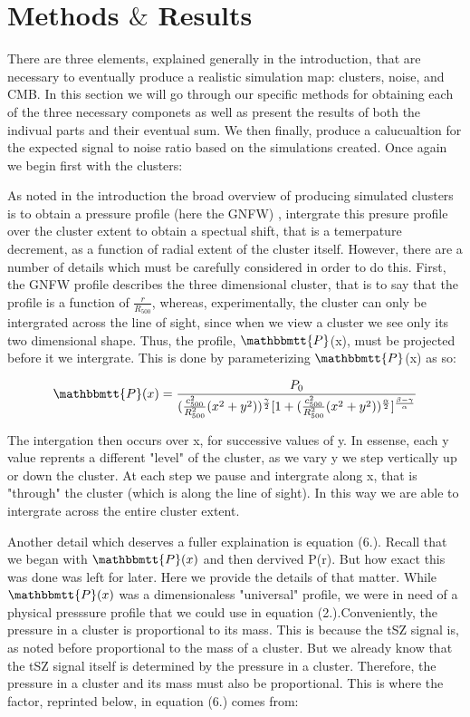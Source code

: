 \documentclass[12pt]{article} %
\begin{document}
\section{Methods $\&$ Results}

There are three elements, explained generally in the introduction, that are necessary to eventually produce a realistic simulation map: clusters, noise, and CMB. In this section we will go through our specific methods for obtaining each of the three necessary componets as well as present the results of both the indivual parts and their eventual sum. We then finally, produce a calucualtion for the expected signal to noise ratio based on the simulations created.  Once again we begin first with the clusters:

As noted in the introduction the broad overview of producing simulated clusters is to obtain a pressure profile (here the GNFW) , intergrate this presure profile over the cluster extent to obtain a spectual shift, that is a  temerpature decrement, as a function of radial extent of the cluster itself. However, there are a number of details which must be carefully considered in order to do this. First, the GNFW profile describes the three dimensional cluster, that is to say that the profile is a function of $\frac{r}{R_{500}}$, whereas, experimentally, the cluster can only be intergrated across the line of sight, since when we view a cluster we see only its two dimensional shape. Thus, the profile,  $\mathbbmtt{P}$(x), must be projected before it we intergrate. This is done by parameterizing $\mathbbmtt{P}$(x) as so:


\begin{equation}
\mathbbmtt{P}(x)=\frac{P_0}{(\frac{c_{500}^2}{R_{500}^2}(x^2 + y^2))^\frac{\gamma}{2} [1 + (\frac{c_{500}^2}{R_{500}^2}(x^2 + y^2))^\frac{\alpha}{2}]^\frac{\beta - \gamma}{\alpha}} 
\end{equation}

The intergation then occurs over x,  for successive values of y. In essense, each y value reprents a different "level" of the cluster, as we vary y we step vertically up or down the cluster. At each step we pause and intergrate along x, that is "through" the cluster (which is along the line of sight). In this way we are able to intergrate across the entire cluster extent. 

Another detail which deserves a fuller explaination is equation (6.). Recall that we began with $\mathbbmtt{P}(x)$ and then dervived P(r). But how exact this was done was left for later. Here we provide the details of that matter. While $ \mathbbmtt{P}(x)$ was a dimensionaless "universal" profile, we were in need of a physical presssure profile that we could use in equation (2.).Conveniently, the pressure in a cluster is proportional to its mass. This is because the tSZ signal is, as noted before proportional to the mass of a cluster. But we already know that the tSZ signal itself is determined by the pressure in a cluster. Therefore, the pressure in a cluster and its mass must also be proportional.  This is where the factor, reprinted below, in equation (6.) comes from:
\end{document}
